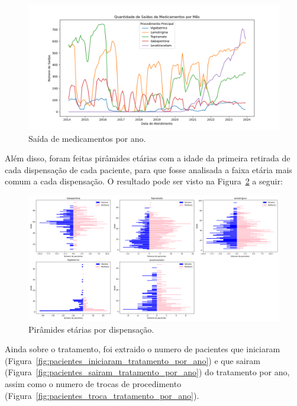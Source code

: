 \documentclass[article,a4paper,12pt,brazil,sumario=tradicional]{abntex2}
\begin{document}
\begin{figure}[!ht]
    \centering
    \includegraphics[width=1\textwidth]{saida_medicamentos_por_mes.png}
    \caption{Saída de medicamentos por ano.}
    \label{fig:saida_medicamentos_por_mes}
\end{figure}

Além disso, foram feitas pirâmides etárias com a idade da primeira retirada de cada dispensação de cada paciente, para que fosse analisada a faixa etária mais comum a cada dispensação. O resultado pode ser visto na Figura~\ref{fig:grid_piramides_etarias_medicamento} a seguir:

\begin{figure}[!ht]
    \centering
    \includegraphics[width=1\textwidth]{grid_piramides_etarias_medicamento.png}
    \caption{Pirâmides etárias por dispensação.}
    \label{fig:grid_piramides_etarias_medicamento}
\end{figure}

Ainda sobre o tratamento, foi extraido o numero de pacientes que iniciaram (Figura~\ref{fig:pacientes_iniciaram_tratamento_por_ano}) e que sairam (Figura~\ref{fig:pacientes_sairam_tratamento_por_ano}) do tratamento por ano, assim como o numero de trocas de procedimento (Figura~\ref{fig:pacientes_troca_tratamento_por_ano}).
\end{document}
